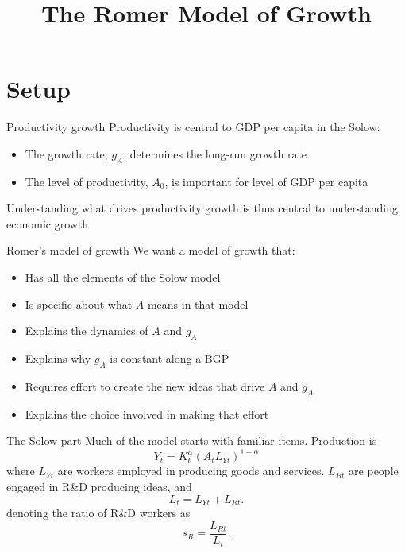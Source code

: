 

\title[Romer]{The Romer Model of Growth}


\maketitle

\section{Setup}
\begin{frame}{Productivity growth}
Productivity is central to GDP per capita in the Solow:
\begin{itemize}
	\item The growth rate, $g_A$, determines the long-run growth rate
	\item The level of productivity, $A_0$, is important for level of GDP per capita
\end{itemize}
Understanding what drives productivity growth is thus central to understanding economic growth
\end{frame}

\begin{frame}{Romer's model of growth}
We want a model of growth that:
\begin{itemize}
	\item Has all the elements of the Solow model
	\item Is specific about what $A$ means in that model
	\item Explains the dynamics of $A$ and $g_A$
	\item Explains why $g_A$ is constant along a BGP
	\item Requires effort to create the new ideas that drive $A$ and $g_A$
	\item Explains the choice involved in making that effort
\end{itemize}
\end{frame}

\begin{frame}{The Solow part}
Much of the model starts with familiar items. Production is
\begin{equation}
	Y_t = K_t^{\alpha}(A_t L_{Yt})^{1-\alpha} \label{EQ_final_romer}
\end{equation}
where $L_{Yt}$ are workers employed in producing goods and services. $L_{Rt}$ are people engaged in R\&D producing ideas, and
\begin{equation}
	L_t = L_{Yt} + L_{Rt}.
\end{equation}
denoting the ratio of R\&D workers as
\begin{equation}
	s_R = \frac{L_{Rt}}{L_t}.
\end{equation}
\end{frame}

